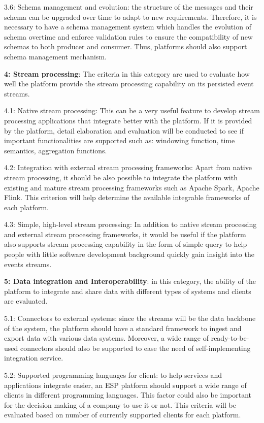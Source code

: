 3.6: Schema management and evolution: the structure of the messages and their schema can be upgraded over time to adapt to new requirements. Therefore, it is necessary to have a schema management system which handles the evolution of schema overtime and enforce validation rules to ensure the compatibility of new schemas to both producer and consumer. Thus, platforms should also support schema management mechanism.

\textbf{4: Stream processing}: The criteria in this category are used to evaluate how well the platform provide the stream processing capability on its persisted event streams.

4.1: Native stream processing: This can be a very useful feature to develop stream processing applications that integrate better with the platform. If it is provided by the platform, detail elaboration and evaluation will be conducted to see if important functionalities are supported such as: windowing function, time semantics, aggregation functions.

4.2: Integration with external stream processing frameworks: Apart from native stream processing, it should be also possible to integrate the platform with existing and mature stream processing frameworks such as Apache Spark, Apache Flink. This criterion will help determine the available integrable frameworks of each platform.

4.3: Simple, high-level stream processing: In addition to native stream processing and external stream processing frameworks, it would be useful if the platform also supports stream processing capability in the form of simple query to help people with little software development background quickly gain insight into the events streams. 

\textbf{5: Data integration and Interoperability}: in this category, the ability of the platform to integrate and share data with different types of systems and clients are evaluated.

5.1: Connectors to external systems: since the streams will be the data backbone of the system, the platform should have a standard framework to ingest and export data with various data systems. Moreover, a wide range of ready-to-be-used connectors should also be supported to ease the need of self-implementing integration service.

5.2: Supported programming languages for client: to help services and applications integrate easier, an ESP platform should support a wide range of clients in different programming languages. This factor could also be important for the decision making of a company to use it or not. This criteria will be evaluated based on number of currently supported clients for each platform.

